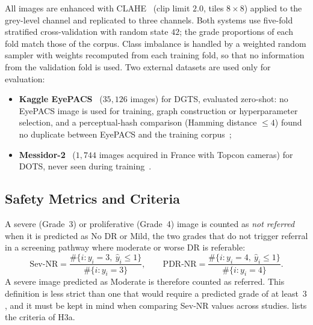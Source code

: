 All images are enhanced with CLAHE~\cite{zuiderveld1994clahe} (clip limit $2.0$, tiles
$8\times8$) applied to the grey-level channel and replicated to three channels. Both
systems use five-fold stratified cross-validation with random state $42$; the grade
proportions of each fold match those of the corpus. Class imbalance is handled by a
weighted random sampler with weights recomputed from each training fold, so that no
information from the validation fold is used. Two external datasets are used only for
evaluation:
\begin{itemize}[leftmargin=1.4em,itemsep=2pt]
\item \textbf{Kaggle EyePACS}~\cite{kaggle2015eyepacs} ($35{,}126$ images) for DGTS,
evaluated zero-shot: no EyePACS image is used for training, graph construction or
hyperparameter selection, and a perceptual-hash comparison (Hamming distance $\leq4$)
found no duplicate between EyePACS and the training corpus~\cite{belhadj2026dgts};
\item \textbf{Messidor-2}~\cite{decenciere2014messidor} ($1{,}744$ images acquired in
France with Topcon cameras) for DOTS, never seen during training~\cite{belhadj2026dots}.
\end{itemize}

\subsection{Safety Metrics and Criteria}

A severe (Grade~3) or proliferative (Grade~4) image is counted as \emph{not referred} when
it is predicted as No DR or Mild, the two grades that do not trigger referral in a
screening pathway where moderate or worse DR is referable:
\begin{equation}
\text{Sev-NR} = \frac{\#\{i: y_i=3,\ \hat y_i\leq1\}}{\#\{i: y_i=3\}},\qquad
\text{PDR-NR} = \frac{\#\{i: y_i=4,\ \hat y_i\leq1\}}{\#\{i: y_i=4\}} .
\label{eq:nr}
\end{equation}
A severe image predicted as Moderate is therefore counted as referred. This definition is
less strict than one that would require a predicted grade of at least~$3$, and it must be
kept in mind when comparing Sev-NR values across studies.  lists the
criteria of H3a.

